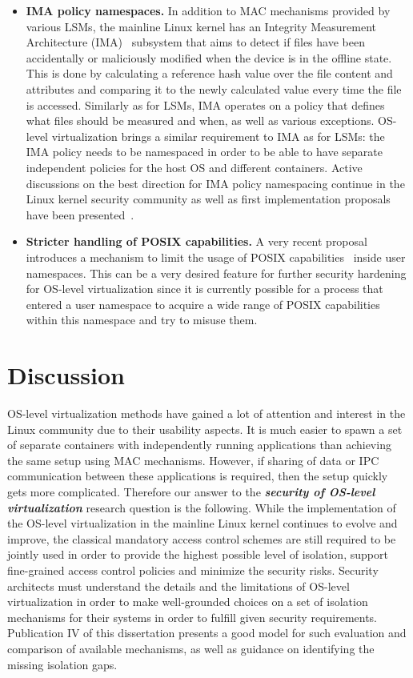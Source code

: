 \begin{itemize}
	\item \textbf{IMA policy namespaces.} In addition to MAC mechanisms provided by various LSMs, the mainline Linux kernel has an Integrity Measurement Architecture (IMA)~\cite{ima} subsystem that aims to detect if files have been accidentally or maliciously modified when the device is in the offline state. This is done by calculating a reference hash value over the file content and attributes and comparing it to the newly calculated value every time the file is accessed. Similarly as for LSMs, IMA operates on a policy that defines what files should be measured and when, as well as various exceptions. OS-level virtualization brings a similar requirement to IMA as for LSMs: the IMA policy needs to be namespaced in order to be able to have separate independent policies for the host OS and different containers. Active discussions on the best direction for IMA policy namespacing continue in the Linux kernel security community as well as first implementation proposals have been presented~\cite{magalhaes2017}. 
	\item \textbf{Stricter handling of POSIX capabilities.} A very recent proposal~\cite{Bandewar2017} introduces a mechanism to limit the usage of POSIX capabilities~\cite{caps} inside user namespaces. This can be a very desired feature for further security hardening for OS-level virtualization since it is currently possible for a process that entered a user namespace to acquire a wide range of POSIX capabilities within this namespace and try to misuse them. 
\end{itemize}


\section{Discussion}

OS-level virtualization methods have gained a lot of attention and interest in the Linux community due to their usability aspects. It is much easier to spawn a set of separate containers with independently running applications than achieving the same setup using MAC mechanisms. However, if sharing of data or IPC communication between these applications is required, then the setup quickly gets more complicated. Therefore our answer to the \textbf{\textit{security of OS-level virtualization}} research question is the following. While the implementation of the OS-level virtualization in the mainline Linux kernel continues to evolve and improve, the classical mandatory access control schemes are still required to be jointly used in order to provide the highest possible level of isolation, support fine-grained access control policies and minimize the security risks. Security architects must understand the details and the limitations of OS-level virtualization in order to make well-grounded choices on a set of isolation mechanisms for their systems in order to fulfill given security requirements. Publication IV of this dissertation presents a good model for such evaluation and comparison of available mechanisms, as well as guidance on identifying the missing isolation gaps. 

